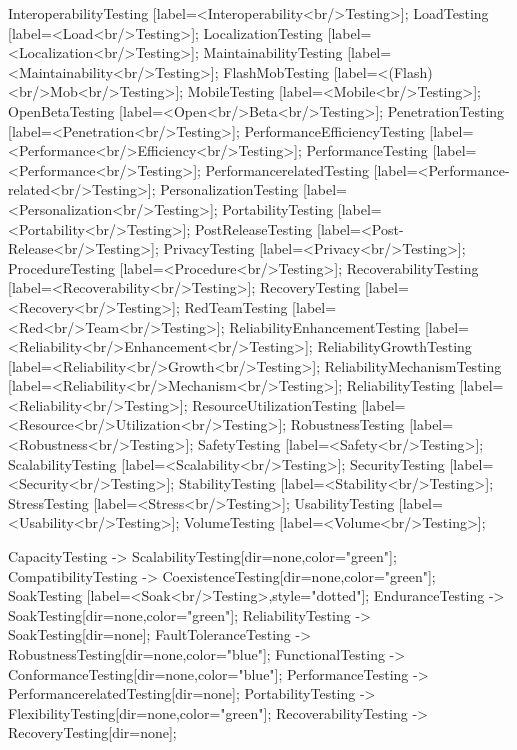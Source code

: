 \documentclass{article}
\begin{document}
{InteroperabilityTesting [label=<Interoperability<br/>Testing>];
LoadTesting [label=<Load<br/>Testing>];
LocalizationTesting [label=<Localization<br/>Testing>];
MaintainabilityTesting [label=<Maintainability<br/>Testing>];
FlashMobTesting [label=<(Flash)<br/>Mob<br/>Testing>];
MobileTesting [label=<Mobile<br/>Testing>];
OpenBetaTesting [label=<Open<br/>Beta<br/>Testing>];
PenetrationTesting [label=<Penetration<br/>Testing>];
PerformanceEfficiencyTesting [label=<Performance<br/>Efficiency<br/>Testing>];
PerformanceTesting [label=<Performance<br/>Testing>];
PerformancerelatedTesting [label=<Performance-related<br/>Testing>];
PersonalizationTesting [label=<Personalization<br/>Testing>];
PortabilityTesting [label=<Portability<br/>Testing>];
PostReleaseTesting [label=<Post-Release<br/>Testing>];
PrivacyTesting [label=<Privacy<br/>Testing>];
ProcedureTesting [label=<Procedure<br/>Testing>];
RecoverabilityTesting [label=<Recoverability<br/>Testing>];
RecoveryTesting [label=<Recovery<br/>Testing>];
RedTeamTesting [label=<Red<br/>Team<br/>Testing>];
ReliabilityEnhancementTesting [label=<Reliability<br/>Enhancement<br/>Testing>];
ReliabilityGrowthTesting [label=<Reliability<br/>Growth<br/>Testing>];
ReliabilityMechanismTesting [label=<Reliability<br/>Mechanism<br/>Testing>];
ReliabilityTesting [label=<Reliability<br/>Testing>];
ResourceUtilizationTesting [label=<Resource<br/>Utilization<br/>Testing>];
RobustnessTesting [label=<Robustness<br/>Testing>];
SafetyTesting [label=<Safety<br/>Testing>];
ScalabilityTesting [label=<Scalability<br/>Testing>];
SecurityTesting [label=<Security<br/>Testing>];
StabilityTesting [label=<Stability<br/>Testing>];
StressTesting [label=<Stress<br/>Testing>];
UsabilityTesting [label=<Usability<br/>Testing>];
VolumeTesting [label=<Volume<br/>Testing>];

CapacityTesting -> ScalabilityTesting[dir=none,color="green"];
CompatibilityTesting -> CoexistenceTesting[dir=none,color="green"];
SoakTesting [label=<Soak<br/>Testing>,style="dotted"];
EnduranceTesting -> SoakTesting[dir=none,color="green"];
ReliabilityTesting -> SoakTesting[dir=none];
FaultToleranceTesting -> RobustnessTesting[dir=none,color="blue"];
FunctionalTesting -> ConformanceTesting[dir=none,color="blue"];
PerformanceTesting -> PerformancerelatedTesting[dir=none];
PortabilityTesting -> FlexibilityTesting[dir=none,color="green"];
RecoverabilityTesting -> RecoveryTesting[dir=none];

}
\end{document}
